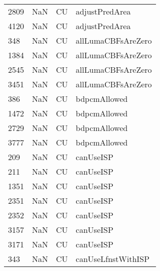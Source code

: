 \begin{tabular}{llll}
2809 &                   NaN &                         CU &                            adjustPredArea \\
4120 &                   NaN &                         CU &                            adjustPredArea \\
348  &                   NaN &                         CU &                        allLumaCBFsAreZero \\
1384 &                   NaN &                         CU &                        allLumaCBFsAreZero \\
2545 &                   NaN &                         CU &                        allLumaCBFsAreZero \\
3451 &                   NaN &                         CU &                        allLumaCBFsAreZero \\
386  &                   NaN &                         CU &                              bdpcmAllowed \\
1472 &                   NaN &                         CU &                              bdpcmAllowed \\
2729 &                   NaN &                         CU &                              bdpcmAllowed \\
3777 &                   NaN &                         CU &                              bdpcmAllowed \\
209  &                   NaN &                         CU &                                 canUseISP \\
211  &                   NaN &                         CU &                                 canUseISP \\
1351 &                   NaN &                         CU &                                 canUseISP \\
2351 &                   NaN &                         CU &                                 canUseISP \\
2352 &                   NaN &                         CU &                                 canUseISP \\
3157 &                   NaN &                         CU &                                 canUseISP \\
3171 &                   NaN &                         CU &                                 canUseISP \\
343  &                   NaN &                         CU &                        canUseLfnstWithISP \\

\end{tabular}
